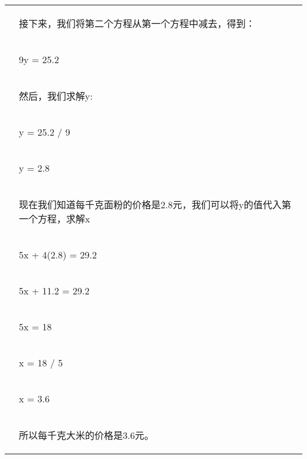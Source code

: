 \documentclass{article}
\begin{document}
\begin{table}[h!]
\begin{tabular}{ c|l }
             & \begin{CJK*}{UTF8}{gbsn} 接下来，我们将第二个方程从第一个方程中减去，得到：\end{CJK*} \\
             & \begin{CJK*}{UTF8}{gbsn} 9y = 25.2\end{CJK*} \\
             & \begin{CJK*}{UTF8}{gbsn} 然后，我们求解y:\end{CJK*} \\
             & \begin{CJK*}{UTF8}{gbsn} y = 25.2 / 9\end{CJK*} \\
             & \begin{CJK*}{UTF8}{gbsn} y = 2.8\end{CJK*} \\
             & \begin{CJK*}{UTF8}{gbsn} 现在我们知道每千克面粉的价格是2.8元，我们可以将y的值代入第一个方程，求解x \end{CJK*} \\
             & \begin{CJK*}{UTF8}{gbsn} 5x + 4(2.8) = 29.2\end{CJK*} \\
             & \begin{CJK*}{UTF8}{gbsn} 5x + 11.2 = 29.2\end{CJK*} \\
             & \begin{CJK*}{UTF8}{gbsn} 5x = 18\end{CJK*} \\
             & \begin{CJK*}{UTF8}{gbsn} x = 18 / 5\end{CJK*} \\
             & \begin{CJK*}{UTF8}{gbsn} x = 3.6\end{CJK*} \\
             & \begin{CJK*}{UTF8}{gbsn} 所以每千克大米的价格是3.6元。\end{CJK*} \\
             

\end{tabular}
\end{table}
\end{document}
